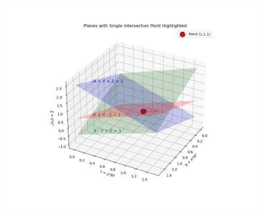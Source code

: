 \documentclass[journal]{IEEEtran}
\begin{document}
\begin{figure}[H]
    \centering
    \includegraphics[width=0.55\linewidth]{figs/fig1.png}
    \caption{}
    \label{fig:placeholder}
\end{figure}
\end{document}
